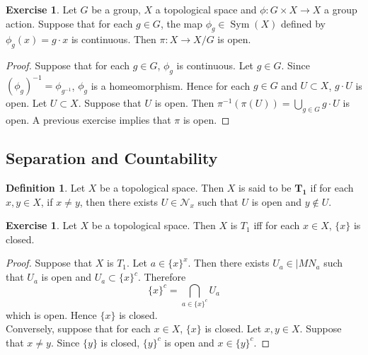 \documentclass[12pt]{amsart}
\theoremstyle{definition}
\newtheorem{defn}[definition]{Definition}
\newtheorem{ex}[definition]{Exercise}
\newcommand{\MN}{\mathcal{N}}
\DeclareMathOperator{\Sym}{Sym}
\begin{document}
	
	
	\begin{ex}
		Let $G$ be a group, $X$ a topological space and $\phi: G \times X \rightarrow X$ a group action. Suppose that for each $g \in G$, the map $\phi_g \in \Sym(X)$ defined by $\phi_g(x) = g \cdot x$ is continuous. Then $\pi: X \rightarrow X / G$ is open. 
	\end{ex}

	\begin{proof}
		Suppose that for each $g \in G$, $\phi_g$ is continuous. Let $g \in G$. Since $(\phi_g)^{-1} = \phi_{g^{-1}}$, $\phi_g$ is a homeomorphism. Hence for each $g \in G$ and $U \subset X$, $g \cdot U$ is open. Let $U \subset X$. Suppose that $U$ is open. Then $\pi^{-1}(\pi(U)) = \bigcup_{g \in G} g \cdot U$ is open. A previous exercise implies that $\pi$ is open.
	\end{proof}

	
	
	
	
	
	
	
	
	
	
	
	
	
	
	
	
	
	
	
	
	
	
	
	
	
	
	
	\newpage
	\subsection{Separation and Countability}
	
	\begin{defn}
		Let $X$ be a topological space. Then $X$ is said to be $\mathbf{T_1}$ if for each $x,y \in X$, if $x \neq y$, then there exists $U \in \MN_x$ such that $U$ is open and $y \not \in U$.
	\end{defn}
	
	\begin{ex}
		Let $X$ be a topological space. Then $X$ is $T_1$ iff for each $x \in X$, $\{x\}$ is closed. 
	\end{ex}
	
	\begin{proof}
		Suppose that $X$ is $T_1$. Let $a \in \{x\}^x$. Then there exists $U_{a} \in |MN_a$ such that $U_a$ is open and $U_{a} \subset \{x\}^c$. Therefore 
		$$\{x\}^c = \bigcap_{a \in \{x\}^c} U_a$$ 
		which is open. Hence $\{x\}$ is closed. \\
		Conversely, suppose that for each $x \in X$, $\{x\}$ is closed. Let $x, y \in X$. Suppose that $x \neq y$. Since $\{y\}$ is closed, $\{y\}^c$ is open and $x \in \{y\}^c$. 
	\end{proof}
	
\end{document}
